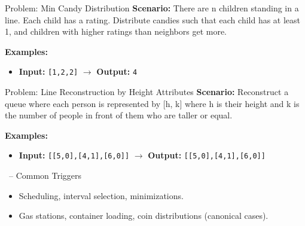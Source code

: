 \begin{frame}[fragile]{Problem: Min Candy Distribution}
  \textbf{Scenario:}
  There are n children standing in a line. Each child has a rating. Distribute candies such that each child has at least 1, and children with higher ratings than neighbors get more.
  
  \vspace{0.3cm}
  \textbf{Examples:}
  \begin{itemize}
    \item \textbf{Input:} \texttt{[1,2,2]} $\rightarrow$ \textbf{Output:} \texttt{4}
  \end{itemize}
\end{frame}

\begin{frame}[fragile]{Problem: Line Reconstruction by Height Attributes}
  \textbf{Scenario:}
  Reconstruct a queue where each person is represented by [h, k] where h is their height and k is the number of people in front of them who are taller or equal.
  
  \vspace{0.3cm}
  \textbf{Examples:}
  \begin{itemize}
    \item \textbf{Input:} \texttt{[[5,0],[4,1],[6,0]]} $\rightarrow$ \textbf{Output:} \texttt{[[5,0],[4,1],[6,0]]}
  \end{itemize}
\end{frame}

\begin{frame}{\secname\ -- Common Triggers}
  \begin{itemize}
    \item Scheduling, interval selection, minimizations.
        \item Gas stations, container loading, coin distributions (canonical cases).
  \end{itemize}
\end{frame}
